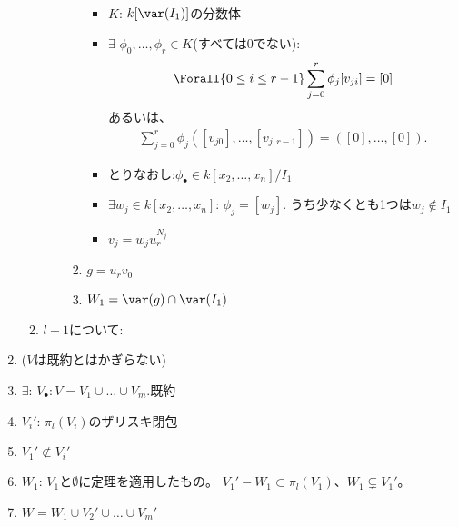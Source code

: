 \begin{enumerate}
\begin{enumerate}
\begin{enumerate}
\begin{enumerate}
\begin{itemize}
\begin{align}
        \end{align}
        \item $K$: $k[\var(I_1)]$の分数体
        \item $\exists$ $\phi_0,\dots,\phi_r \in K$(すべては0でない):
        \begin{align}
          \Forall{0\le i \le r-1} \sum_{j=0}^r \phi_j [v_{ji}] = [0]
        \end{align}
        あるいは、
        \begin{align}
          \sum_{j=0}^r \phi_j ([v_{j0}],\dots,[v_{j,r-1}]) = ([0],\dots, [0]).
        \end{align}
        \item
        とりなおし:$\phi_\bullet \in k[x_2,\dots,x_n]/I_1$
        \item
        $\exists w_j \in k[x_2,\dots,x_n]$: $\phi_j = [w_j]$.
        うち少なくとも1つは$w_j \notin I_1$
        \item
        $ v_j = w_j u_r^{N_j}$
      \end{itemize}
      \item $g=u_r v_0$
      \item $W_1 = \var(g) \cap \var(I_1)$
    \end{enumerate}
  \end{enumerate}
  \item $l-1$について:
  \end{enumerate}
  \item ($V$は既約とはかぎらない)
  \item $\exists$: $V_\bullet: V = V_1\cup \dots \cup V_m.$既約
  \item
  $V_i'$: $\pi_l(V_i)$のザリスキ閉包
  \item
  $V_1' \not\subset V_i'$
  \item
  $W_1$: $V_1$と$\emptyset$に定理を適用したもの。
  $V_1' - W_1 \subset \pi_l(V_1)$、$W_1 \subsetneq V_1'$。
  \item
  $W = W_1 \cup V_2' \cup \dots \cup V_m'$
\end{enumerate}

